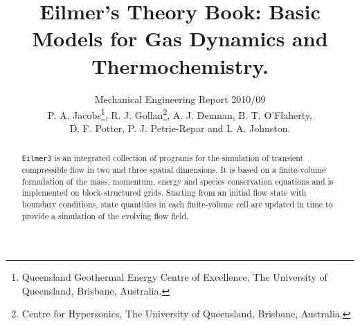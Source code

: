 \documentclass[12pt,a4paper,twoside]{article}
\title{
    Eilmer's Theory Book: Basic Models for Gas Dynamics and Thermochemistry.
}
\author{
    Mechanical Engineering Report 2010/09\\
    P. A. Jacobs\thanks{Queensland Geothermal Energy Centre of Excellence, The University of Queensland, Brisbane, Australia.}, 
    R. J. Gollan\thanks{Centre for Hypersonics, The University of Queensland, Brisbane, Australia.},
    A. J. Denman, B. T. O'Flaherty, \\
    D. F. Potter, P. J. Petrie-Repar and I. A. Johnston.
}
\begin{document}
\maketitle

\begin{abstract}
\texttt{Eilmer3} is an integrated collection of programs for the simulation of transient
compressible flow in two and three spatial dimensions.
It is based on a finite-volume formulation of the mass, momentum, energy and species conservation equations
and is implemented on block-structured grids.
Starting from an initial flow state with boundary conditions, state quantities in each finite-volume cell 
are updated in time to provide a simulation of the evolving flow field.
\end{abstract}

\clearpage

\tableofcontents

\newpage
\end{document}
